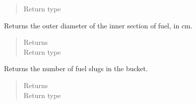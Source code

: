 \documentclass[letterpaper,10pt,openany,oneside,english]{sphinxmanual}
\begin{document}
\begin{fulllineitems}
\begin{fulllineitems}
\begin{quote}
\begin{description}
\item[{Return type}] \leavevmode
{}

\end{description}\end{quote}

\end{fulllineitems}


\begin{fulllineitems}
\label{\detokenize{support_rst/fuel_bucket:fuel_bucket.FuelBucket.inner_slug_od}}
Returns the outer  diameter of the inner section of fuel, in cm.
\begin{quote}\begin{description}
\item[{Returns}] \leavevmode
{}

\item[{Return type}] \leavevmode
{}

\end{description}\end{quote}

\end{fulllineitems}


\begin{fulllineitems}
\label{\detokenize{support_rst/fuel_bucket:fuel_bucket.FuelBucket.n_slugs}}
Returns the number of fuel slugs in the bucket.
\begin{quote}\begin{description}
\item[{Returns}] \leavevmode
{}

\item[{Return type}] \leavevmode
{}

\end{description}\end{quote}

\end{fulllineitems}



\end{fulllineitems}
\end{document}
